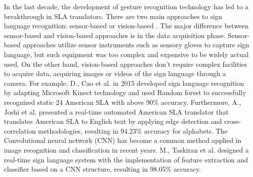 In the last decade, the development of gesture recognition technology has led to a breakthrough in SLA translators. There are two main approaches to sign language recognition: sensor-based or vision-based \cite{Cheok2019ARO}. The major difference between sensor-based and vision-based approaches is in the data acquisition phase. Sensor-based approaches utilize sensor instruments such as sensory gloves to capture sign language, but such equipment was too complex and expensive to be widely actual used. On the other hand, vision-based approaches don't require complex facilities to acquire data, acquiring images or videos of the sign language through a camera. For example, D., Cao et al.\cite{7301347} in 2015 developed sign language recognition by adapting Microsoft Kinect technology and used Random forest to successfully recognized static 24 American SLA with above 90\% accuracy. Furthermore, A., Joshi et al.\cite{8088212} presented a real-time automated American SLA translator that translates American SLA to English text by applying edge detection and cross-correlation methodologies, resulting in 94.23\% accuracy for alphabets. The Convolutional neural network (CNN) has become a common method applied in image recognition and classification in recent years. M., Taskiran et al.\cite{8441304} designed a real-time sign language system with the implementation of feature extraction and classifier based on a CNN structure, resulting in 98.05\% accuracy.